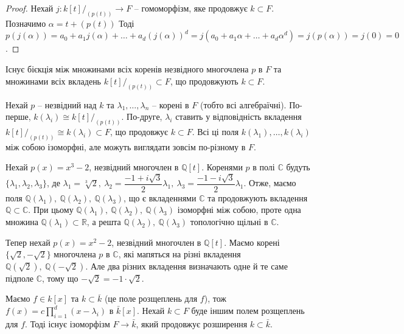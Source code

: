 \documentclass{math_library}
\begin{document}
\begin{proof}
Нехай $j \colon k[t]/_{(p(t))} \to F$ -- гомоморфізм, яке продовжує $k \subset F$. Позначимо $\alpha = t + (p(t))$ Тоді\\
$p(j(\alpha)) = a_0 + a_1 j(\alpha) + \dots + a_d (j(\alpha))^d = j(a_0 + a_1 \alpha + \dots + a_d \alpha^d) = j(p(\alpha)) = j(0) = 0$.
\end{proof}

\begin{corollary}
Існує бієкція між множинами всіх коренів незвідного многочлена $p$ в $F$ та множинами всіх вкладень $k[t]/_{(p(t))} \subset F$, що продовжують $k \subset F$.
\end{corollary}

Нехай $p$ -- незвідний над $k$ та $\lambda_1,\dots,\lambda_n$ -- корені в $F$ (тобто всі алгебраїчні). По-перше, $k(\lambda_i) \cong k[t]/_{(p(t))}$. По-друге, $\lambda_i$ ставить у відповідність вкладення $k[t]/_{(p(t))} \cong k(\lambda_i) \subset F$, що продовжує $k \subset F$. Всі ці поля $k(\lambda_1),\dots,k(\lambda_i)$ між собою ізоморфні, але можуть виглядати зовсім по-різному в $F$.

\begin{example}
Нехай $p(x) = x^3 - 2$, незвідний многочлен в $\mathbb{Q}[t]$. Коренями $p$ в полі $\mathbb{C}$ будуть $\{\lambda_1,\lambda_2,\lambda_3\}$, де $\lambda_1 = \sqrt[3]{2},\ \lambda_2 = \dfrac{-1+i \sqrt{3}}{2} \lambda_1,\ \lambda_3 = \dfrac{-1-i\sqrt{3}}{2} \lambda_1$. Отже, маємо поля $\mathbb{Q}(\lambda_1),\ \mathbb{Q}(\lambda_2),\ \mathbb{Q}(\lambda_3)$, що є вкладеннями $\mathbb{C}$ та продовжують вкладення $\mathbb{Q} \subset \mathbb{C}$. При цьому $\mathbb{Q}(\lambda_1),\ \mathbb{Q}(\lambda_2),\ \mathbb{Q}(\lambda_3)$ ізоморфні між собою, проте одна множина $\mathbb{Q}(\lambda_1) \subset \mathbb{R}$, а решта $\mathbb{Q}(\lambda_2),\ \mathbb{Q}(\lambda_3)$ топологічно щільні в $\mathbb{C}$.
\end{example}

\begin{example}
Тепер нехай $p(x) = x^2 - 2$, незвідний многочлен в $\mathbb{Q}[t]$. Маємо корені $\{ \sqrt{2}, -\sqrt{2}\}$ многочлена $p$ в $\mathbb{C}$, які мапяться на різні вкладення $\mathbb{Q}(\sqrt{2}),\ \mathbb{Q}(-\sqrt{2})$. Але два різних вкладення визначають одне й те саме підполе $\mathbb{C}$, тому що $-\sqrt{2} = -1 \cdot \sqrt{2}$.
\end{example}

\begin{proposition}
Маємо $f \in k[x]$ та $k \subset \overline{k}$ (це поле розщеплень для $f$), тож $f(x) = c\displaystyle\prod_{i=1}^d (x-\lambda_i)$ в $\bar{k}[x]$. Нехай $k \subset F$ буде іншим полем розщеплень для $f$. Тоді існує ізоморфізм $F \to \bar{k}$, який продовжує розширення $k \subset \bar{k}$.
\end{proposition}
\end{document}
